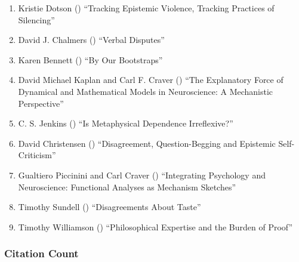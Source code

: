 \documentclass[
  10pt,
  letterpaper,
  DIV=11,
  numbers=noendperiod,
  twoside]{scrartcl}
\providecommand{\tightlist}{%
  \setlength{\itemsep}{0pt}\setlength{\parskip}{0pt}}\usepackage{longtable,booktabs,array}
\begin{document}
\begin{enumerate}
\def\labelenumi{\arabic{enumi}.}
\tightlist
\item
  Kristie Dotson () ``Tracking
  Epistemic Violence, Tracking Practices of Silencing''
\item
  David J. Chalmers () ``Verbal
  Disputes''
\item
  Karen Bennett () ``By Our
  Bootstraps''
\item
  David Michael Kaplan and Carl F. Craver
  () ``The Explanatory Force of
  Dynamical and Mathematical Models in Neuroscience: A Mechanistic
  Perspective''
\item
  C. S. Jenkins () ``Is
  Metaphysical Dependence Irreflexive?''
\item
  David Christensen ()
  ``Disagreement, Question-Begging and Epistemic Self-Criticism''
\item
  Gualtiero Piccinini and Carl Craver
  () ``Integrating Psychology and
  Neuroscience: Functional Analyses as Mechanism Sketches''
\item
  Timothy Sundell ()
  ``Disagreements About Taste''
\item
  Timothy Williamson ()
  ``Philosophical Expertise and the Burden of Proof''
\end{enumerate}

\subsubsection*{Citation Count}\label{sec-count-2011}
\end{document}
